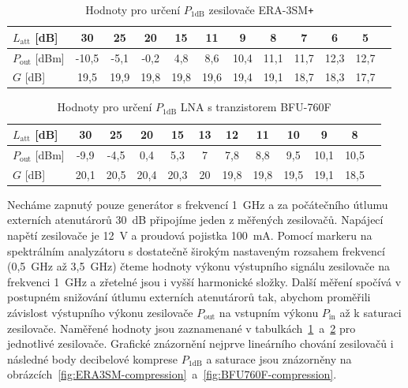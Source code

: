 \documentclass[11pt,a4paper]{article}
\newcommand{\plus}{{\texttt{+}}}
\begin{document}
\begin{table}[!ht]
\begin{center}
\begin{tabular}{| l || c | c | c | c | c | c | c | c | c | c | c |}
    \hline
    $L_{\mathrm{att}}$ [dB] & 30 & 25 & 20 & 15 & 11 & 9 & 8 & 7 & 6 & 5 \\
    \hline
    $P_{\mathrm{out}}$ [dBm] & -10,5 & -5,1 & -0,2 & 4,8 & 8,6 & 10,4 & 11,1 & 11,7 & 12,3 & 12,7 \\
    \hline\hline
    $G$ [dB] & 19,5 & 19,9 & 19,8 & 19,8 & 19,6 & 19,4 & 19,1 & 18,7 & 18,3 & 17,7 \\
    \hline
\end{tabular}
\caption{Hodnoty pro určení $P_{1\mathrm{dB}}$ zesilovače ERA-3SM\plus}
\label{table:ERA3SM-compression}
\end{center}
\end{table}

\begin{table}[!ht]
\begin{center}
\begin{tabular}{| l || c | c | c | c | c | c | c | c | c | c | c |}
    \hline
    $L_{\mathrm{att}}$ [dB] & 30 & 25 & 20 & 15 & 13 & 12 & 11 & 10 & 9 & 8 \\
    \hline
    $P_{\mathrm{out}}$ [dBm] & -9,9 & -4,5 & 0,4 & 5,3 & 7 & 7,8 & 8,8 & 9,5 & 10,1 & 10,5 \\
    \hline\hline
    $G$ [dB] & 20,1 & 20,5 & 20,4 & 20,3 & 20 & 19,8 & 19,8 & 19,5 & 19,1 & 18,5 \\
    \hline
\end{tabular}
\caption{Hodnoty pro určení $P_{1\mathrm{dB}}$ LNA s tranzistorem BFU-760F}
\label{table:BFU760F-compression}
\end{center}
\end{table}

Necháme zapnutý pouze generátor s frekvencí 1~GHz a za počátečního útlumu externích atenutárorů 30~dB připojíme jeden z měřených zesilovačů. Napájecí napětí zesilovače je 12~V a proudová pojistka 100~mA. Pomocí markeru na spektrálním analyzátoru s dostatečně širokým nastaveným rozsahem frekvencí (0,5~GHz až 3,5~GHz) čteme hodnoty výkonu výstupního signálu zesilovače na frekvenci 1~GHz a zřetelné jsou i vyšší harmonické složky. Další měření spočívá v postupném snižování útlumu externích atenutárorů tak, abychom proměřili závislost výstupního výkonu zesilovače $P_{\mathrm{out}}$ na vstupním výkonu $P_{\mathrm{in}}$ až k saturaci zesilovače. Naměřené hodnoty jsou zaznamenané v tabulkách~\ref{table:ERA3SM-compression}~a~\ref{table:BFU760F-compression} pro jednotlivé zesilovače. Grafické znázornění nejprve lineárního chování zesilovačů i následné body decibelové komprese $P_{1\mathrm{dB}}$ a saturace jsou znázorněny na obrázcích~\ref{fig:ERA3SM-compression}~a~\ref{fig:BFU760F-compression}.
\end{document}
